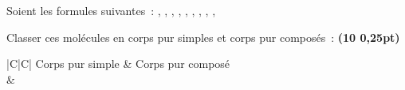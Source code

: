 Soient les formules suivantes~:
, , , , , , , ,
, 

Classer ces molécules en corps pur simples et corps pur composés~:
\textbf{(10 \texttimes{} 0,25pt)} \par
\begin{minipage}{\linewidth}
\begin{table}[H]
    \centering
    \setlength{\arrayrulewidth}{0.8pt}
    \renewcommand{\arraystretch}{1.5}
    \begin{tabularx}{\textwidth}{|C|C|}
        \hline Corps pur simple & Corps pur composé \\
        \hline \raisebox{1.0cm} & \\ 
        \hline  
    \end{tabularx}
\end{table}
\end{minipage}

